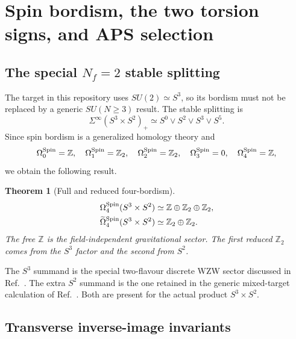 \documentclass[11pt]{article}
\newtheorem{theorem}{Theorem}[section]
\theoremstyle{definition}
\theoremstyle{remark}
\newcommand{\ZZ}{\mathbb Z}
\begin{document}
\section{Spin bordism, the two torsion signs, and APS selection}

\subsection{The special \texorpdfstring{\(N_f=2\)}{Nf=2} stable splitting}

The target in this repository uses \(SU(2)\simeq S^3\), so its bordism must
not be replaced by a generic \(SU(N\ge3)\) result.  The stable splitting is
\begin{equation}
 \Sigma^\infty(S^3\times S^2)_+
 \simeq S^0\vee S^2\vee S^3\vee S^5.
 \label{eq:stable-splitting}
\end{equation}
Since spin bordism is a generalized homology theory and
\begin{equation}
 \Omega^{\rm Spin}_0=\ZZ,\quad
 \Omega^{\rm Spin}_1=\ZZ_2,\quad
 \Omega^{\rm Spin}_2=\ZZ_2,\quad
 \Omega^{\rm Spin}_3=0,\quad
 \Omega^{\rm Spin}_4=\ZZ,
 \label{eq:low-spin-bordism}
\end{equation}
we obtain the following result.

\begin{theorem}[Full and reduced four-bordism]
\begin{align}
 \Omega^{\rm Spin}_4(S^3\times S^2)
 &\simeq\ZZ\oplus\ZZ_2\oplus\ZZ_2,\notag\\
 \widetilde\Omega^{\rm Spin}_4(S^3\times S^2)
 &\simeq\ZZ_2\oplus\ZZ_2.
 \label{eq:bordism-result}
\end{align}
The free \(\ZZ\) is the field-independent gravitational sector.  The first
reduced \(\ZZ_2\) comes from the \(S^3\) factor and the second from \(S^2\).
\end{theorem}

The \(S^3\) summand is the special two-flavour discrete WZW sector discussed
in Ref.~\cite{LeeOhmoriTachikawa2021Global}.  The extra \(S^2\) summand is the
one retained in the generic mixed-target calculation of
Ref.~\cite{DavighiLohitsiri2024Global}.  Both are present for the actual
product \(S^3\times S^2\).

\subsection{Transverse inverse-image invariants}
\end{document}
